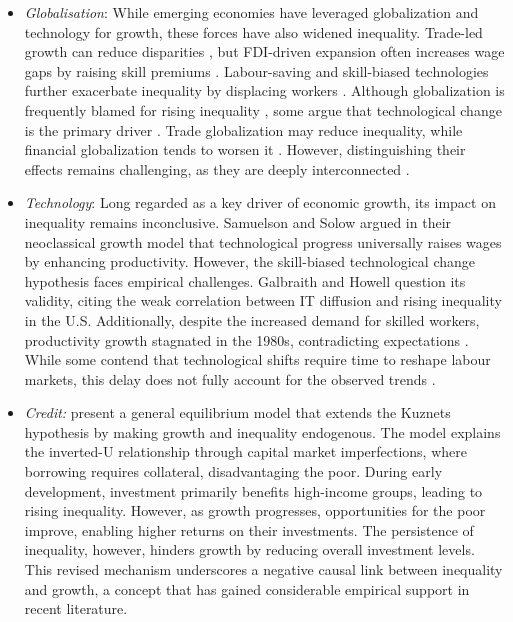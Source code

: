 \begin{itemize}
    \item \textit{Globalisation}: While emerging economies have leveraged globalization and technology for growth, these forces have also widened inequality. Trade-led growth can reduce disparities \parencite{jaumotte2013rising}, but FDI-driven expansion often increases wage gaps by raising skill premiums \parencite{Eichengreen2021}. Labour-saving and skill-biased technologies further exacerbate inequality by displacing workers \parencite{acemoglu2019automation}. Although globalization is frequently blamed for rising inequality \parencite{ravallion2018inequality}, some argue that technological change is the primary driver \parencite{furceri2019robust}. Trade globalization may reduce inequality, while financial globalization tends to worsen it \parencite{asteriou2014globalization}. However, distinguishing their effects remains challenging, as they are deeply interconnected \parencite{davis2018fourth}.
    \item \textit{Technology}: Long regarded as a key driver of economic growth, its impact on inequality remains inconclusive. Samuelson \parencite*{Samuelson1964} and Solow \parencite*{Solow1956, Solow1957} argued in their neoclassical growth model that technological progress universally raises wages by enhancing productivity. However, the skill-biased technological change hypothesis faces empirical challenges. Galbraith \parencite{galbraith1998created} and Howell \parencite*{Howell1996} question its validity, citing the weak correlation between IT diffusion and rising inequality in the U.S. Additionally, despite the increased demand for skilled workers, productivity growth stagnated in the 1980s, contradicting expectations \parencite{Rosenberg1982}. While some contend that technological shifts require time to reshape labour markets, this delay does not fully account for the observed trends \parencite{galbraith2016inequality}.
    \item \textit{Credit:} \textcite{galor1996income} present a general equilibrium model that extends the Kuznets hypothesis by making growth and inequality endogenous. The model explains the inverted-U relationship through capital market imperfections, where borrowing requires collateral, disadvantaging the poor. During early development, investment primarily benefits high-income groups, leading to rising inequality. However, as growth progresses, opportunities for the poor improve, enabling higher returns on their investments. The persistence of inequality, however, hinders growth by reducing overall investment levels. This revised mechanism underscores a negative causal link between inequality and growth, a concept that has gained considerable empirical support in recent literature.

\end{itemize}

